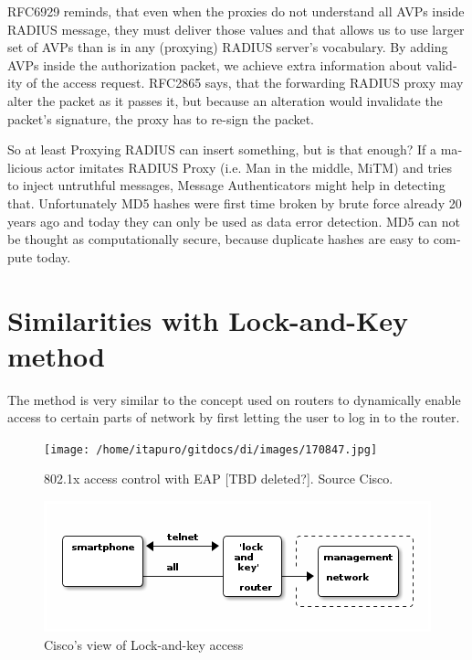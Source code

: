 \documentclass[12pt,a4paper,english]{tutthesis}
\begin{document}
\begin{otherlanguage}{english}
RFC6929\cite{rfc6929} reminds, that even when
the proxies do not understand all AVPs inside RADIUS message, they
must deliver those values and that allows us to use larger set of AVPs 
than is in any (proxying) RADIUS server's vocabulary.
By adding AVPs inside the authorization packet, we achieve extra
information about validity of the access request.
RFC2865\cite{rfc2865} says, that the forwarding RADIUS proxy may alter
the packet as it passes it, but because an alteration would invalidate the
packet's signature, the proxy has to re-sign the packet.




So at least Proxying RADIUS can insert something, but is that enough?
If a malicious actor imitates RADIUS Proxy (i.e. Man in the
middle, MiTM) and tries to inject untruthful messages, Message Authenticators might help in detecting
that. Unfortunately MD5 hashes were first time broken by brute force
already 20 years ago and today they can only be used as data error
detection\cite[p.2]{rfc6151}. MD5 can not be thought as
computationally secure, because duplicate hashes are easy to compute today\cite{xie2013fast}. 





\section{Similarities with Lock-and-Key method}
\label{sec-4-8}
The method is very similar to the concept used on routers to dynamically enable
access to certain parts of network by first letting the user to log in
to the router.


\begin{figure}[htb]
\centering
\texttt{[image: /home/itapuro/gitdocs/di/images/170847.jpg]}
\caption{\label{fig:cisco-802.1x}802.1x access control with EAP [TBD deleted?]. Source Cisco.}
\end{figure}






\begin{figure}[htb]
\centering
\includegraphics[width=.9\linewidth]{lockandkey.png}
\caption{\label{fig:lock-and-view}Cisco's view of Lock-and-key access}
\end{figure}





\end{otherlanguage}
\end{document}
